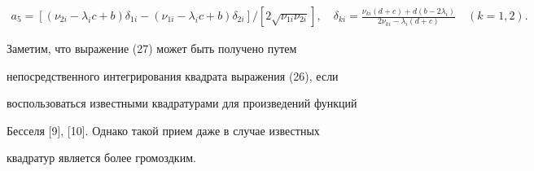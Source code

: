 \begin{exam}
\begin{gather*}
% 


a_5=[(\nu_{2i}-\lambda_i c+b)\delta_{1i}- 


(\nu_{1i}-\lambda_i c+b)\delta_{2i}]/ 


[2\sqrt{\nu_{1i}\nu_{2i}}],\quad 


\delta_{k i}=\frac{\nu_{k i}(d+c)+d(b-2\lambda_i)} 


{2\nu_{k i}-\lambda_i(d+c)}\quad (k=1,2). 


\end{gather*} 


Заметим, что выражение (27) может быть получено путем 


непосредственного интегрирования квадрата выражения (26), если 


воспользоваться известными квадратурами для произведений функций 


Бесселя [9], [10]. Однако такой прием даже в случае известных 


квадратур является более громоздким. 


\end{exam} 


 


